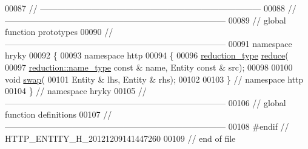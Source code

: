\begin{DoxyCode}
00087 \textcolor{comment}{//
      ------------------------------------------------------------------------------}
00088 \textcolor{comment}{//
      ------------------------------------------------------------------------------}
00089 \textcolor{comment}{// global function prototypes}
00090 \textcolor{comment}{//
      ------------------------------------------------------------------------------}
00091 \textcolor{keyword}{namespace }hryky
00092 \{
00093 \textcolor{keyword}{namespace }http
00094 \{
00096     \hyperlink{namespacehryky_a343a9a4c36a586be5c2693156200eadc}{reduction_type} \hyperlink{namespacehryky_1_1http_a08fc36a78a8e2908140fcd102829a566}{reduce}(
00097         \hyperlink{namespacehryky_1_1reduction_ac686c30a4c8d196bbd0f05629a6b921f}{reduction::name_type} \textcolor{keyword}{const} & name, Entity \textcolor{keyword}{const} & src);
00098 
00100     \textcolor{keywordtype}{void} \hyperlink{namespacehryky_1_1http_a38e62595ad532d18fbc65ceb61973aec}{swap}(
00101         Entity & lhs, Entity & rhs);
00102 
00103 \} \textcolor{comment}{// namespace http}
00104 \} \textcolor{comment}{// namespace hryky}
00105 \textcolor{comment}{//
      ------------------------------------------------------------------------------}
00106 \textcolor{comment}{// global function definitions}
00107 \textcolor{comment}{//
      ------------------------------------------------------------------------------}
00108 \textcolor{preprocessor}{#endif // HTTP\_ENTITY\_H\_20121209141447260}
00109 \textcolor{preprocessor}{}\textcolor{comment}{// end of file}
\end{DoxyCode}
